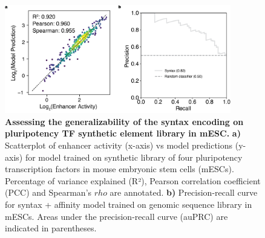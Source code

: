 \begin{figure}[p]
    \centering
    \includegraphics[width=0.88\textwidth]{2_figures-and-files/SuppFig16.png}
    \caption[Assessing the generalizability of the syntax encoding on pluripotency TF synthetic element library in mESC.]{\textbf{Assessing the generalizability of the syntax encoding on pluripotency TF synthetic element library in mESC.} \textbf{a)} Scatterplot of enhancer activity (x-axis) vs model predictions (y-axis) for model trained on synthetic library of four pluripotency transcription factors in mouse embryonic stem cells (mESCs). Percentage of variance explained (R²), Pearson correlation coefficient (PCC) and Spearman’s $rho$ are annotated. \textbf{b)} Precision-recall curve for syntax + affinity model trained on genomic sequence library in mESCs. Areas under the precision-recall curve (auPRC) are indicated in parentheses.}
    \label{fig:supplementary_16}
\end{figure}
